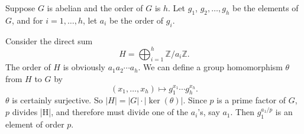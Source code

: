 \documentclass[12pt]{article}
\begin{document}
Suppose $G$ is abelian and the order of $G$ is $h$. Let $g_1$, $g_2,\ldots, g_h$ be the elements of $G$, and for $i=1,\ldots, h$, let $a_i$ be the order of $g_i$.

Consider the direct sum
\[
  H = \bigoplus_{i=1}^h \mathbb{Z}/a_i\mathbb{Z}.
\]
The order of $H$ is obviously $a_1a_2\cdots a_h$. We can define a group homomorphism $\theta$ from $H$ to $G$ by
\[
  (x_1,\ldots,x_h) \mapsto g_1^{x_1}\cdots g_h^{x_h}.
\]
$\theta$ is certainly surjective. So $|H| = |G|\cdot|\ker(\theta)|$. Since $p$ is a prime factor of $G$, $p$ divides |H|, and therefore must divide one of the $a_i$'s, say $a_1$. Then $g_1^{a_1/p}$ is an element of order $p$.
\end{document}
